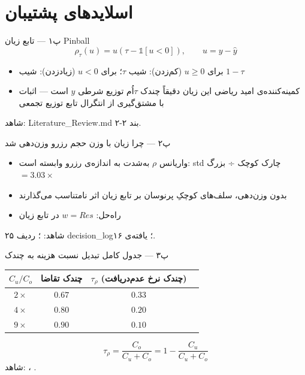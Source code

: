 \section*{اسلایدهای پشتیبان}


\begin{frame}{پ۱ — تابع زیان Pinball}
  \[
    \rho_\tau(u) = u\left(\tau - \mathbb{1}[u<0]\right), \qquad u = y - \hat y
  \]
  \begin{itemize}
    \item برای $u\ge 0$ (کم‌زدن): شیب $\tau$؛ برای $u<0$ (زیادزدن): شیب $1-\tau$
    \item کمینه‌کننده‌ی امید ریاضی این زیان دقیقاً چندک $\tau$اُم توزیع شرطی $y$ است — اثبات
      با مشتق‌گیری از انتگرال تابع توزیع تجمعی
  \end{itemize}
  {\small شاهد: Literature\_Review.md بند ۲-۲.}
\end{frame}

\begin{frame}{پ۲ — چرا زیان با وزن حجم رزرو وزن‌دهی شد}
  \begin{itemize}
    \item واریانس $\rho$ به‌شدت به اندازه‌ی رزرو وابسته است: std چارک کوچک ÷ بزرگ $=3.03\times$
    \item بدون وزن‌دهی، سلف‌های کوچکِ پرنوسان بر تابع زیان اثر نامتناسب می‌گذارند
    \item راه‌حل: $w=Res$ در تابع زیان
  \end{itemize}
  {\small شاهد: ؛ ردیف ۲۵ decision\_log؛ یافته‌ی ۱۶.}
\end{frame}

\begin{frame}{پ۳ — جدول کامل تبدیل نسبت هزینه به چندک}
  \begin{center}
  \begin{tabular}{cccc}
    \toprule
    $C_u/C_o$ & چندک تقاضا & $\tau_\rho$ (چندک نرخ عدم‌دریافت) \\
    \midrule
    $2\times$ & $0.67$ & $0.33$ \\
    $4\times$ & $0.80$ & $0.20$ \\
    $9\times$ & $0.90$ & $0.10$ \\
    \bottomrule
  \end{tabular}
  \end{center}
  \[
    \tau_\rho = \frac{C_o}{C_u+C_o} = 1 - \frac{C_u}{C_u+C_o}
  \]
  {\small شاهد: ، .}
\end{frame}

